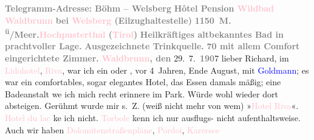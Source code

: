            \noindent{}{\pb}\textcolor{gray}{\textbf{Telegramm-Adresse: Böhm – Welsberg}}\pend
           \pstart
           \textcolor{gray}{\textbf{Hôtel {\kaufmannsund} Pension \textcolor{pink}{Wildbad Waldbrunn}{}\ledrightnote{\textcolor{pink}{Wildbad Waldbrunn}}}}\pend
           \pstart
           \textcolor{gray}{\textbf{bei \textcolor{pink}{Welsberg}{}\ledrightnote{\textcolor{pink}{Welsberg-Taisten}}
                     (Eilzughaltestelle)}}\pend
           \pstart
           \textcolor{gray}{\textbf{1150 M. \textsuperscript{ü}/Meer.\hspace*{1.5em}\textcolor{pink}{Hochpusterthal}{}\ledrightnote{\textcolor{pink}{Pustertal}} (\textcolor{pink}{Tirol}{}\ledrightnote{\textcolor{pink}{Tirol}})}}\pend
           \pstart
           \textcolor{gray}{\textbf{Heilkräftiges altbekanntes Bad in prachtvoller Lage.}}\pend
           \pstart
           \textcolor{gray}{\textbf{Ausgezeichnete Trinkquelle.}}\pend
           \pstart
           \textcolor{gray}{\textbf{70 mit allem Comfort eingerichtete Zimmer.}}\pend
           \pstart
           \raggedleft{}\textcolor{gray}{\textbf{\textcolor{pink}{Waldbrunn}{}\ledrightnote{\textcolor{pink}{Welsberg-Taisten}}, den}}{ }29. 7. \textcolor{gray}{\textbf{190}}7\pend
           \pstart{}lieber Richard,\pend\pstart
           im \textcolor{pink}{Lidohotel}{}\ledrightnote{\textcolor{pink}{Palast Hotel Lido}}, \textcolor{pink}{Riva}{}\ledrightnote{\textcolor{pink}{Riva del Garda}}, war ich ein oder \label{K_L01695_1v}\label{K_L01695_1h}, vor 4 Jahren, Ende August, mit \textcolor{blue}{Goldmann}{}\ledrightnote{\textcolor{blue}{Paul Goldmann}}; es war ein comfortables, sogar elegantes Hotel, das Essen damals
               mäßig; eine Badeanstalt we{\geminationn} ich mich recht erinnere im
               Park. Würde wohl wieder dort absteigen. Gerühmt wurde mir s. Z. (weiß nicht mehr von
               wem) »\textcolor{pink}{Hotel Riva}{}\ledrightnote{\textcolor{pink}{Grand Hotel Riva}}«. \textcolor{pink}{Hotel du lac}{}\ledrightnote{\textcolor{pink}{Hotel du Lac}} ke{\geminationn} ich nicht. \textcolor{pink}{Torbole}{}\ledrightnote{\textcolor{pink}{Torbole sul Garda}} kenn ich nur ausflugs- nicht aufenthaltsweise.\pend
           \pstart
           Auch wir haben \textcolor{pink}{Dolomitenstraßenpläne}{}\ledrightnote{\textcolor{pink}{Große Dolomitenstraße}}, \textcolor{pink}{Pordoi}{}\ledrightnote{\textcolor{pink}{Pordoijoch}}, \textcolor{pink}{Karersee}{}\ledrightnote{\textcolor{pink}{Karersee}}
